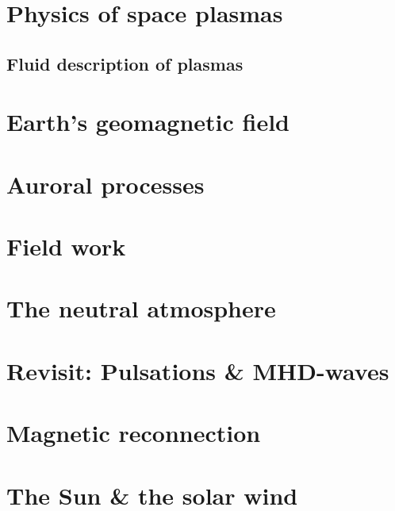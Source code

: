 \documentclass[small_title,unis]{book_class}
\begin{document}
\maketitle
\tableofcontents

\chapter{Physics of space plasmas}



\section{Fluid description of plasmas}



\chapter{Earth's geomagnetic field}



\chapter{Auroral processes}



\chapter{Field work}



\chapter{The neutral atmosphere}



\chapter{Revisit: Pulsations \& MHD-waves}



\chapter{Magnetic reconnection}



\chapter{The Sun \& the solar wind}

\end{document}
